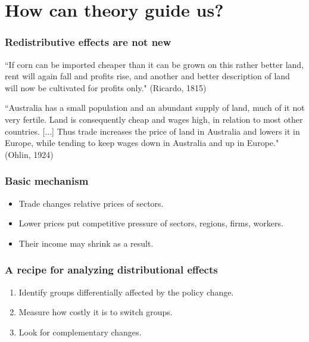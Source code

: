 \documentclass[aspectratio=169,compress,mathserif]{beamer}
\newcommand{\directory}{./exhibits}
\newcommand{\longfigure}[2]{\begin{frame}\frametitle{\hyperlink{#1back}{#2}}\hypertarget{#1}{{\begin{center}\texttt{[image: \\directory/\#1]}\end{center}}}\end{frame}}
\begin{document}
\section{How can theory guide us?}\hypertarget{How can theory guide us?}{}


\begin{frame}\frametitle{Redistributive effects are not new}\hypertarget{Redistributive effects are not new}{}
``If corn can be imported cheaper than it can be grown on this rather better land, rent will again fall and profits rise, and another and better description of land will now be cultivated for profits only." (Ricardo, 1815)
\pause


\bigskip
``Australia has a small population and an abundant supply of land, much of it not very
fertile. Land is consequently cheap and wages high, in relation to most other countries.
[...] Thus trade increases
the price of land in Australia and lowers it in Europe, while tending to keep wages down
in Australia and up in Europe." (Ohlin, 1924)


\end{frame}



\begin{frame}\frametitle{Basic mechanism}\hypertarget{Basic mechanism}{}
\begin{itemize}
\item Trade changes relative prices of sectors.

\item Lower prices put competitive pressure of sectors, regions, firms, workers.

\item Their income may shrink as a result.










\end{itemize}
\end{frame}



\begin{frame}\frametitle{A recipe for analyzing distributional effects}\hypertarget{A recipe for analyzing distributional effects}{}
\begin{enumerate}\setcounter{enumi}{0}
\item Identify groups differentially affected by the policy change.

\item Measure how costly it is to switch groups.

\item Look for complementary changes. 


\end{enumerate}
\end{frame}
\end{document}
